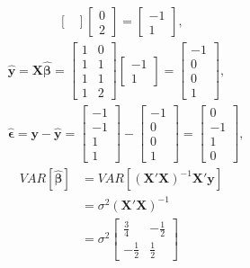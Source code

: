 \documentclass[10pt]{article}
\begin{document}
\begin{enumerate}[1)]
\begin{align*}
\begin{bmatrix}
  \end{bmatrix}
  \begin{bmatrix}
    0\\
    2
  \end{bmatrix}
=
  \begin{bmatrix}
    -1\\
    1
  \end{bmatrix}
,
\end{align*}
\begin{align*}
&\pmb{\hat{y}}=\pmb{X}\pmb{\hat{\beta}}=
  \begin{bmatrix}
    1 & 0\\
    1 & 1\\
    1 & 1\\
    1 & 2
  \end{bmatrix}
  \begin{bmatrix}
    -1\\
    1
  \end{bmatrix}
=
  \begin{bmatrix}
    -1\\
    0\\
    0\\
    1
  \end{bmatrix}
,\\
&\pmb{\hat{\epsilon}}=
\pmb{y}-\pmb{\hat{y}}=
  \begin{bmatrix}
    -1\\
    -1\\
    1\\
    1
  \end{bmatrix}
-
  \begin{bmatrix}
    -1\\
    0\\
    0\\
    1
  \end{bmatrix}
=
  \begin{bmatrix}
    0\\
    -1\\
    1\\
    0
  \end{bmatrix}
,
\end{align*}
\begin{align*}
VAR[\pmb{\hat{\beta}}]&=VAR[(\pmb{X}'\pmb{X})^{-1}\pmb{X}'\pmb{y}]\\
&=\sigma^2(\pmb{X}'\pmb{X})^{-1}\\
&=\sigma^2
  \begin{bmatrix}
    \frac{3}{4} & -\frac{1}{2}\\
    -\frac{1}{2} & \frac{1}{2}

\end{bmatrix}
\end{align*}
\end{enumerate}
\end{document}
